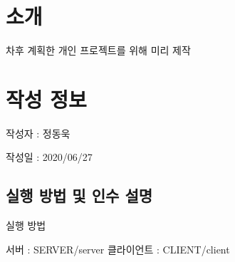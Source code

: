 \hypertarget{index_intro}{}\section{소개}\label{index_intro}

\begin{DoxyItemize}
\item 차후 계획한 개인 프로젝트를 위해 미리 제작 
\end{DoxyItemize}\hypertarget{index_CreateInfo}{}\section{작성 정보}\label{index_CreateInfo}

\begin{DoxyItemize}
\item 작성자 \-: 정동욱
\item 작성일 \-: 2020/06/27 
\end{DoxyItemize}\hypertarget{index_exec}{}\subsection{실행 방법 및 인수 설명}\label{index_exec}

\begin{DoxyItemize}
\item 실행 방법\par
 서버 \-: S\-E\-R\-V\-E\-R/server 클라이언트 \-: C\-L\-I\-E\-N\-T/client 
\end{DoxyItemize}